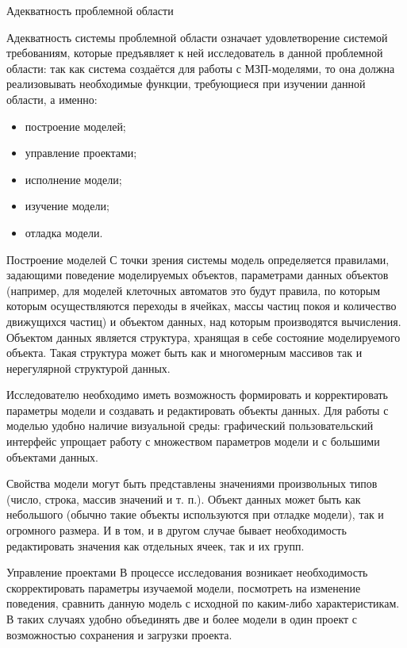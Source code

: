 \documentclass[a4paper,12pt]{extarticle}
\begin{document}
\begin{subsection}{Адекватность проблемной области}
    \label{sec:requirements-adequacy}

    Адекватность системы проблемной области означает удовлетворение системой требованиям, которые предъявляет к ней исследователь в данной проблемной области: так как система создаётся для работы с МЗП-моделями, то она должна реализовывать необходимые функции, требующиеся при изучении данной области, а именно:
    \begin{itemize}
        \item построение моделей;
        \item управление проектами;
        \item исполнение модели;
        \item изучение модели;
        \item отладка модели.
    \end{itemize}

    \begin{subsubsection}{Построение моделей}
        С точки зрения системы модель определяется правилами, задающими поведение моделируемых объектов, параметрами данных объектов (например, для моделей клеточных автоматов это будут правила, по которым которым осуществляются переходы в ячейках, массы частиц покоя и количество движущихся частиц) и объектом данных, над которым производятся вычисления. Объектом данных является структура, хранящая в себе состояние моделируемого объекта. Такая структура может быть как и многомерным массивов так и нерегулярной структурой данных.
        
        Исследователю необходимо иметь возможность формировать и корректировать параметры модели и создавать и редактировать объекты данных. Для работы с моделью удобно наличие визуальной среды: графический пользовательский интерфейс упрощает работу с множеством параметров модели и с большими объектами данных.
        
        Свойства модели могут быть представлены значениями произвольных типов (число, строка, массив значений и т. п.). Объект данных может быть как небольшого (обычно такие объекты используются при отладке модели), так и огромного размера. И в том, и в другом случае бывает необходимость редактировать значения как отдельных ячеек, так и их групп.
    \end{subsubsection}
        
    \begin{subsubsection}{Управление проектами}
        В процессе исследования возникает необходимость скорректировать параметры изучаемой модели, посмотреть на изменение поведения, сравнить данную модель с исходной по каким-либо характеристикам. В таких случаях удобно объединять две и более модели в один проект с возможностью сохранения и загрузки проекта. 
        

\end{subsubsection}
\end{subsection}
\end{document}
